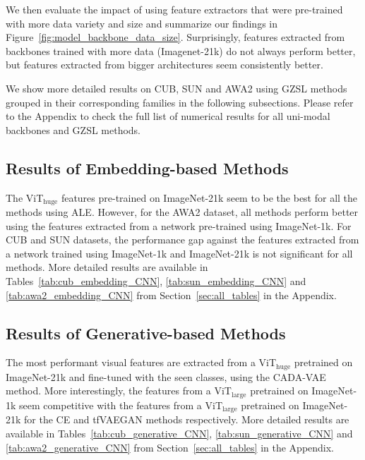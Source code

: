 We then evaluate the impact of using feature extractors that were pre-trained with more data variety and size and summarize our findings in Figure~\ref{fig:model_backbone_data_size}. Surprisingly, features extracted from backbones trained with more data (Imagenet-21k) do not always perform better, but features extracted from bigger architectures seem consistently better. 


We show more detailed results on CUB, SUN and AWA2 using GZSL methods grouped in their corresponding families in the following subsections.
Please refer to the Appendix to check the full list of numerical results for all uni-modal backbones and GZSL methods. 

\subsection{Results of \textbf{Embedding}-based Methods}

The ViT$_{\text{huge}}$ features pre-trained on ImageNet-21k seem to be the best for all the methods using ALE. 
However, for the AWA2 dataset, all methods perform better using the features extracted from a network pre-trained using ImageNet-1k.
For CUB and SUN datasets, the performance gap against the features extracted from a network trained using ImageNet-1k and ImageNet-21k is not significant for all methods.
More detailed results are available in Tables~\ref{tab:cub_embedding_CNN}, \ref{tab:sun_embedding_CNN} and \ref{tab:awa2_embedding_CNN} from Section~\ref{sec:all_tables} in the Appendix. 

 
\subsection{Results of \textbf{Generative}-based Methods} 

The most performant visual features are extracted from a ViT$_{\text{huge}}$ pretrained on ImageNet-21k and fine-tuned with the seen classes, using the CADA-VAE method. More interestingly, the features from a ViT$_{\text{large}}$ pretrained on ImageNet-1k seem competitive with the features from a ViT$_{\text{large}}$ pretrained on ImageNet-21k for the CE and tfVAEGAN methods respectively.
More detailed results are available in Tables~\ref{tab:cub_generative_CNN}, \ref{tab:sun_generative_CNN} and \ref{tab:awa2_generative_CNN} from Section~\ref{sec:all_tables} in the Appendix. 

